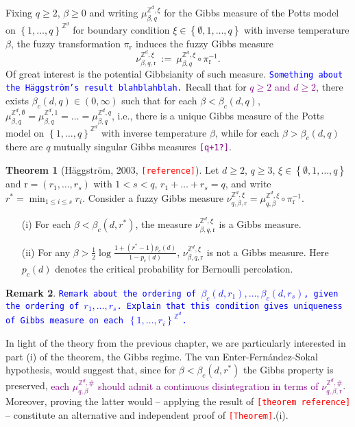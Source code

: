 \documentclass[12pt]{article}
\renewcommand{\r}{\mathrm{r}}
\newcommand{\Z}{\mathbb{Z}}
\newcommand{\set}[1]{\left\{#1\right\}}
\newcommand{\1}{\mathbbm{1}}
\newcommand{\5}{\vspace{0.5cm}}
\theoremstyle{definition}
\newtheorem{thm}{Theorem}[section]
\newtheorem{rem}[thm]{Remark}
\begin{document}
Fixing $q\geq 2$, $\beta\geq 0$ and writing $\mu_{\beta,q}^{\Z^d,\xi}$ for the Gibbs measure of the Potts model on $\set{1,\ldots,q}^{\Z^d}$ for boundary condition $\xi\in\set{\emptyset,1,\ldots,q}$ with inverse temperature $\beta$, the fuzzy transformation $\pi_\r$ induces the fuzzy Gibbs measure 
$$\nu_{\beta,q,\r}^{\Z^d,\xi} ~:=~ \mu_{\beta,q}^{\Z^d,\xi}\circ\pi_\r^{-1}.$$
Of great interest is the potential Gibbsianity of such measure. \textcolor{blue}{\texttt{Something about the H\"aggstr\"om's result blahblahblah.}} Recall that for \textcolor{purple}{$q\geq 2$ and $d\geq 2$}, there exists $\beta_c(d,q)\in(0,\infty)$ such that for each $\beta<\beta_c(d,q)$, $\mu_{\beta,q}^{\Z^d,\emptyset}=\mu_{\beta,q}^{\Z^d,1}=\ldots=\mu_{\beta,q}^{\Z^d,q}$, i.e., there is a unique Gibbs measure of the Potts model on $\set{1,\ldots,q}^{\Z^d}$ with inverse temperature $\beta$, while for each $\beta>\beta_c(d,q)$ there are $q$ mutually singular Gibbs measures \textcolor{purple}{\texttt{[q+1?]}}.

\begin{thm}[H\"aggstr\"om, 2003, \textcolor{red}{\texttt{[reference]}}]
Let $d\geq 2$, $q\geq 3$, $\xi\in\set{\emptyset,1,\ldots,q}$ and $\r=(r_1,\ldots,r_s)$ with $1<s<q$, $r_1+\ldots+r_s=q$, and write $r^*=\min_{1\leq i\leq s}r_i$. Consider a fuzzy Gibbs measure $\nu_{q,\beta,\r}^{\Z^d,\xi}=\mu_{q,\beta}^{\Z^d,\xi}\circ\pi_{\r}^{-1}$.
\begin{itemize}
	\item[(i)] For each $\beta<\beta_c(d,r^*)$, the measure $\nu_{\beta,q,\r}^{\Z^d,\xi}$ is a Gibbs measure.
	\item[(ii)] For any $\beta>\frac{1}{2}\log\frac{1+(r^*-1)p_c(d)}{1-p_c(d)}$, $\nu_{\beta,q,\r}^{\Z^d,\xi}$ is not a Gibbs measure. Here $p_c(d)$ denotes the critical probability for Bernoulli percolation.
\end{itemize}
\end{thm}

\begin{rem}
\textcolor{blue}{\texttt{Remark about the ordering of $\beta_c(d,r_1),\ldots,\beta_c(d,r_s)$, given the ordering of $r_1,\ldots,r_s$. Explain that this condition gives uniqueness of Gibbs measure on each $\set{1,\ldots,r_i}^{\Z^d}$.}}
\end{rem}

In light of the theory from the previous chapter, we are particularly interested in part (i) of the theorem, the Gibbs regime. The van Enter-Fern\'andez-Sokal hypothesis, would suggest that, since for $\beta<\beta_c(d,r^*)$ the Gibbs property is preserved, \textcolor{purple}{each $\mu_{q,\beta}^{\Z^d,\#}$ should admit a continuous disintegration in terms of $\nu_{q,\beta,\r}^{\Z^d,\#}$}. Moreover, proving the latter would -- applying the result of \textcolor{red}{\texttt{[theorem reference]}} -- constitute an alternative and independent proof of \textcolor{red}{\texttt{[Theorem]}}.(i). \\
\end{document}
